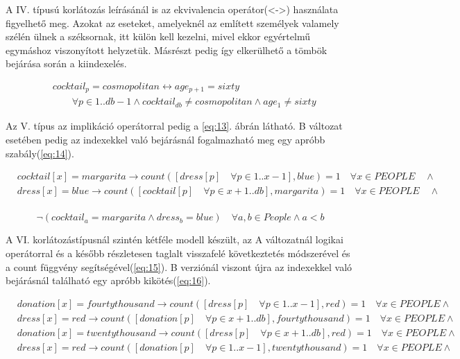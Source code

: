 \documentclass[12pt,a4paper,twoside, openright]{report}
\begin{document}
    A IV. típusú korlátozás leírásánál is az ekvivalencia operátor(<->) használata figyelhető meg.
    Azokat az eseteket, amelyeknél az említett személyek valamely szélén ülnek a széksornak, itt külön kell kezelni, mivel ekkor egyértelmű egymáshoz viszonyított helyzetük.
    Másrészt pedig így elkerülhető a tömbök bejárása során a 
    kiindexelés.

	\begin{equation} \label{eq:12}
	\begin{aligned}
	&cocktail_p=cosmopolitan \leftrightarrow age_{p+1}=sixty \\
	&\quad\quad\forall p \in 1..db-1 \wedge cocktail_{db} \neq cosmopolitan \wedge age_1 \neq sixty
	\end{aligned} 
	\end{equation}

    Az V. típus az implikáció operátorral pedig a \ref{eq:13}. ábrán látható.
    B változat esetében pedig az indexekkel való bejárásnál fogalmazható meg egy apróbb szabály(\ref{eq:14}).
	
	\begin{equation} \label{eq:13}
		\begin{aligned}
		&cocktail[x]=margarita \rightarrow count([dress[p] \quad \forall p \in 1..x-1], blue)=1 \quad \forall x \in PEOPLE \quad \wedge \\
		&dress[x]=blue \rightarrow count([cocktail[p] \quad \forall p \in x+1..db], margarita)=1 \quad \forall x \in PEOPLE \quad \wedge \\
		\end{aligned}
	\end{equation}
	
   \begin{equation} \label{eq:14}
    \neg(cocktail_a =margarita \wedge dress_b=blue) \quad \forall a,b \in People \wedge a<b
     \end{equation}

    A VI. korlátozástípusnál szintén kétféle modell készült, az A változatnál logikai 
    operátorral és a később részletesen taglalt visszafelé következtetés módszerével és a count függvény segítségével(\ref{eq:15}).
    B verziónál viszont újra az indexekkel való bejárásnál található egy apróbb kikötés(\ref{eq:16}).

    \begin{equation} \label{eq:15}
    \begin{aligned}  
    	&donation[x]=fourtythousand \rightarrow count([dress[p] \quad \forall p \in 1..x-1], red)=1 \quad \forall x \in PEOPLE \wedge \\
    	&dress[x]=red \rightarrow count([donation[p] \quad \forall p \in x+1..db], fourtythousand)=1 \quad \forall x \in PEOPLE \wedge \\
    	&donation[x]=twentythousand \rightarrow count([dress[p] \quad \forall p \in x+1..db], red)=1 \quad \forall x \in PEOPLE \wedge \\
    	&dress[x]=red \rightarrow count([donation[p] \quad \forall p \in 1..x-1], twentythousand)=1 \quad \forall x \in PEOPLE \wedge \\
    \end{aligned}
    \end{equation}
    
\end{document}
